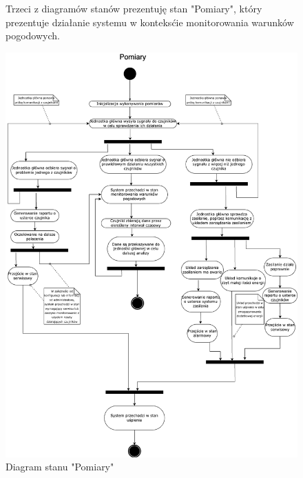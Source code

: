\documentclass{article}
\begin{document}
\begin{figure}
    \centering
    \begin{minipage}{0.6\textwidth}
        \centering
        \large Trzeci z diagramów stanów prezentuję stan "Pomiary", który prezentuje działanie systemu w konteksćie monitorowania warunków pogodowych.
    \end{minipage}
    \includegraphics[scale=0.5]{pomiary.png}
    \caption{Diagram stanu "Pomiary"}
    \label{etykieta3}
\end{figure}
\end{document}
